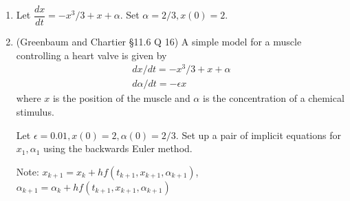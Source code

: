 \documentclass[12pt,letterpaper,noanswers]{exam}
\begin{document}
\begin{enumerate}[resume]
\item Let $\dfrac{dx}{dt} = -x^3/3 + x + \alpha$.  Set $\alpha = 2/3, x(0) = 2$.  

\item (Greenbaum and Chartier \S 11.6 Q 16) A simple model for a muscle controlling a heart valve is given by \[\displaystyle\begin{array}{l} dx/dt = -x^3/3 + x + \alpha \\
d\alpha/dt= -\epsilon x \end{array}\]
where $x$ is the position of the muscle and $\alpha$ is the concentration of a chemical stimulus.

Let $\epsilon = 0.01, x(0) = 2, \alpha(0) = 2/3$.  Set up a pair of implicit equations for $x_1, \alpha_1$ using the backwards Euler method.  

Note: $x_{k+1} = x_k + hf(t_{k+1},x_{k+1},\alpha_{k+1})$, $\alpha_{k+1} = \alpha_k + hf(t_{k+1},x_{k+1},\alpha_{k+1})$ 
\vspace{1in}
\end{enumerate}
\end{document}
